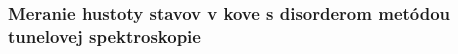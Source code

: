\documentclass[
	11pt, %
]{beamer}
\begin{document}
\begin{frame}
\frametitle{Meranie hustoty stavov v kove s disorderom metódou tunelovej spektroskopie}
\vspace{-15mm}
\begin{figure}%
    \centering

\end{figure}
\end{frame}
\end{document}
